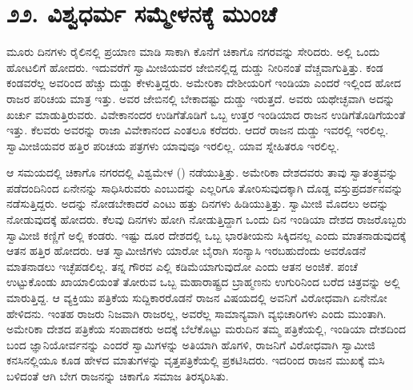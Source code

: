
\chapter*{೨೨. ವಿಶ್ವಧರ್ಮ ಸಮ್ಮೇಳನಕ್ಕೆ ಮುಂಚೆ}

 ಮೂರು ದಿನಗಳು ರೈಲಿನಲ್ಲಿ ಪ್ರಯಾಣ ಮಾಡಿ ಸಾಕಾಗಿ ಕೊನೆಗೆ ಚಿಕಾಗೊ ನಗರವನ್ನು ಸೇರಿದರು. ಅಲ್ಲಿ ಒಂದು ಹೋಟಲಿಗೆ ಹೋದರು. ಇದುವರೆಗೆ ಸ್ವಾಮೀಜಿಯವರ ಜೇಬಿನಲ್ಲಿದ್ದ ದುಡ್ಡು ನೀರಿನಂತೆ ವೆಚ್ಚವಾಗುತ್ತಿತ್ತು. ಕಂಡ ಕಂಡವರೆಲ್ಲ ಅವರಿಂದ ಹೆಚ್ಚು ದುಡ್ಡು ಕೇಳುತ್ತಿದ್ದರು. ಅಮೇರಿಕಾ ದೇಶೀಯರಿಗೆ ಇಂಡಿಯಾ ಎಂದರೆ ಇಲ್ಲಿಂದ ಹೋದ ರಾಜರ ಪರಿಚಯ ಮಾತ್ರ ಇತ್ತು. ಅವರ ಜೇಬಿನಲ್ಲಿ ಬೇಕಾದಷ್ಟು ದುಡ್ಡು ಇರುತ್ತದೆ. ಅವರು ಯಥೇಚ್ಛವಾಗಿ ಅದನ್ನು ಖರ್ಚು ಮಾಡುತ್ತಿರುವರು. ವಿವೇಕಾನಂದರ ಉಡಿಗೆತೊಡಿಗೆ ಒಬ್ಬ ಉತ್ತರ ಇಂಡಿಯಾದ ರಾಜನ ಉಡಿಗೆತೊಡಿಗೆಯಂತೆ ಇತ್ತು. ಕೆಲವರು ಅವರನ್ನು ರಾಜಾ ವಿವೇಕಾನಂದ ಎಂತಲೂ ಕರೆದರು. ಆದರೆ ರಾಜನ ದುಡ್ಡು ಇವರಲ್ಲಿ ಇರಲಿಲ್ಲ. ಸ್ವಾಮೀಜಿಯವರ ಹತ್ತಿರ ಪರಿಚಯ ಪತ್ರಗಳು ಯಾವುವೂ ಇರಲಿಲ್ಲ. ಯಾವ ಸ್ನೇಹಿತರೂ ಇರಲಿಲ್ಲ. 

 ಆ ಸಮಯದಲ್ಲಿ ಚಿಕಾಗೊ ನಗರದಲ್ಲಿ ವಿಶ್ವಮೇಳ () ನಡೆಯುತ್ತಿತ್ತು. ಅಮೇರಿಕಾ ದೇಶದವರು ತಾವು ಸ್ವಾತಂತ್ರ್ಯವನ್ನು ಪಡೆದಂದಿನಿಂದ ಏನೇನನ್ನು ಸಾಧಿಸಿರುವರು ಎಂಬುದನ್ನು ಎಲ್ಲರಿಗೂ ತೋರಿಸುವುದಕ್ಕಾಗಿ ದೊಡ್ಡ ವಸ್ತುಪ್ರದರ್ಶನವನ್ನು ನಡೆಸುತ್ತಿದ್ದರು. ಅದನ್ನು ನೋಡಬೇಕಾದರೆ ಎಂಟು ಹತ್ತು ದಿನಗಳು ಹಿಡಿಯುತ್ತಿತ್ತು. ಸ್ವಾಮೀಜಿ ಮೊದಲು ಅದನ್ನು ನೋಡುವುದಕ್ಕೆ ಹೋದರು. ಕೆಲವು ದಿನಗಳು ಹೋಗಿ ನೋಡುತ್ತಿದ್ದಾಗ ಒಂದು ದಿನ ಇಂಡಿಯಾ ದೇಶದ ರಾಜರೊಬ್ಬರು ಸ್ವಾಮೀಜಿ ಕಣ್ಣಿಗೆ ಅಲ್ಲಿ ಕಂಡರು. ಇಷ್ಟು ದೂರ ದೇಶದಲ್ಲಿ ಒಬ್ಬ ಭಾರತೀಯನು ಸಿಕ್ಕಿದನಲ್ಲ ಎಂದು ಮಾತನಾಡುವುದಕ್ಕೆ ಆತನ ಹತ್ತಿರ ಹೋದರು. ಆತ ಸ್ವಾಮೀಜಿಗಳು ಯಾರೋ ಬೈರಾಗಿ ಸಂನ್ಯಾಸಿ ಇರಬಹುದೆಂದು ಅವರೊಡನೆ ಮಾತನಾಡಲು ಇಚ್ಛೆಪಡಲಿಲ್ಲ. ತನ್ನ ಗೌರವ ಎಲ್ಲಿ ಕಡಿಮೆಯಾಗುವುದೋ ಎಂದು ಆತನ ಅಂಜಿಕೆ. ಪಂಚೆ ಉಟ್ಟುಕೊಂಡು ಖಾಯಾಲಿಯಂತೆ ತೋರುವ ಒಬ್ಬ ಮಹಾರಾಷ್ಟ್ರದ ಬ್ರಾಹ್ಮಣನು ಉಗುರಿನಿಂದ ಬರೆದ ಚಿತ್ರವನ್ನು ಅಲ್ಲಿ ಮಾರುತ್ತಿದ್ದ. ಆ ವ್ಯಕ್ತಿಯು ಪತ್ರಿಕೆಯ ಸುದ್ದಿಕಾರರೊಡನೆ ರಾಜನ ವಿಷಯದಲ್ಲಿ ಅವನಿಗೆ ವಿರೋಧವಾಗಿ ಏನೇನೋ ಹೇಳಿದನು. ಇಂತಹ ರಾಜರು ನಿಜವಾಗಿ ರಾಜರಲ್ಲ, ಅವರೆಲ್ಲ ಸಾಮಾನ್ಯವಾಗಿ ವ್ಯಭಿಚಾರಿಗಳು ಎಂದು ಮುಂತಾಗಿ. ಅಮೇರಿಕಾ ದೇಶದ ಪತ್ರಿಕೆಯ ಸಂಪಾದಕರು ಅದಕ್ಕೆ ಬೆಲೆಕೊಟ್ಟು ಮರುದಿನ ತಮ್ಮ ಪತ್ರಿಕೆಯಲ್ಲಿ, ಇಂಡಿಯಾ ದೇಶದಿಂದ ಬಂದ ಜ್ಞಾನಿಯೋರ್ವನನ್ನು ಎಂದರೆ ಸ್ವಾಮಿಗಳನ್ನು ಅತಿಯಾಗಿ ಹೊಗಳಿ, ರಾಜನಿಗೆ ವಿರೋಧವಾಗಿ ಸ್ವಾಮೀಜಿ ಕನಸಿನಲ್ಲಿಯೂ ಕೂಡ ಹೇಳದ ಮಾತುಗಳನ್ನು ವೃತ್ತಪತ್ರಿಕೆಯಲ್ಲಿ ಪ್ರಕಟಿಸಿದರು. ಇದರಿಂದ ರಾಜನ ಮುಖಕ್ಕೆ ಮಸಿ ಬಳಿದಂತೆ ಆಗಿ ಬೇಗ ರಾಜನನ್ನು ಚಿಕಾಗೊ ಸಮಾಜ ತಿರಸ್ಕರಿಸಿತು. 

